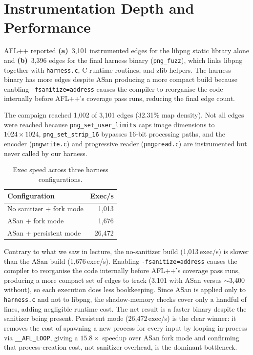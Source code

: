 \section{Instrumentation Depth and Performance}
\vspace{-7pt}
AFL++ reported \textbf{(a)}~3,101 instrumented edges for the
libpng static library alone and \textbf{(b)}~3,396 edges for
the final harness binary (\verb|png_fuzz|), which links libpng
together with \verb|harness.c|, C runtime routines, and zlib
helpers. The harness binary has more edges despite ASan
producing a more compact build because enabling
\texttt{-fsanitize=address} causes the compiler to reorganise
the code internally before AFL++'s coverage pass runs,
reducing the final edge count.

The campaign reached 1{,}002 of 3{,}101 edges (32.31\% map
density). Not all edges were reached because
\texttt{png\_set\_user\_limits} caps image dimensions to
$1024\times1024$, \texttt{png\_set\_strip\_16} bypasses 16-bit
processing paths, and the encoder (\texttt{pngwrite.c}) and
progressive reader (\texttt{pngpread.c}) are instrumented but
never called by our harness.
\vspace{-8pt}
\begin{table}[h]
\centering
\small
\caption{Exec speed across three harness configurations.}
\label{tab:execspeed}
\begin{tabular}{|l|r|}
\hline
\textbf{Configuration} & \textbf{Exec/s} \\
\hline\hline
No sanitizer + fork mode & 1{,}013 \\
ASan + fork mode         & 1{,}676 \\
ASan + persistent mode   & 26{,}472 \\
\hline
\end{tabular}
\end{table}
\vspace{-7pt}
Contrary to what we saw in lecture, the no-sanitizer build
(1{,}013\,exec/s) is slower than the ASan build
(1{,}676\,exec/s). Enabling \texttt{-fsanitize=address} causes
the compiler to reorganise the code internally before AFL++'s
coverage pass runs, producing a more compact set of edges to
track (3{,}101 with ASan versus $\sim$3{,}400 without), so
each execution does less bookkeeping. Since ASan is applied
only to \texttt{harness.c} and not to libpng, the
shadow-memory checks cover only a handful of lines, adding
negligible runtime cost. The net result is a faster binary
despite the sanitizer being present. Persistent mode
(26{,}472\,exec/s) is the clear winner: it removes the cost
of spawning a new process for every input by looping in-process
via \texttt{\_\_AFL\_LOOP}, giving a $15.8{\times}$ speedup
over ASan fork mode and confirming that process-creation cost,
not sanitizer overhead, is the dominant bottleneck.

